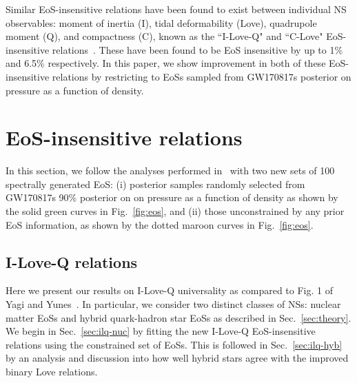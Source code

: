 \documentclass[prd,twocolumn,nofootinbib,superscriptaddress,amsmath,amssymb]{revtex4-1}
\begin{document}
Similar EoS-insensitive relations have been found to exist between individual NS observables: moment of inertia (I), tidal deformability (Love), quadrupole moment (Q), and compactness (C), known as the ``I-Love-Q" and ``C-Love" EoS-insensitive relations~\cite{Yagi:ILQ, Yagi:binLove}.
These have been found to be EoS insensitive by up to 1\% and 6.5\% respectively.
In this paper, we show improvement in both of these EoS-insensitive relations by restricting to EoSs sampled from GW170817s posterior on pressure as a function of density.
\section{EoS-insensitive relations}\label{sec:universal}
In this section, we follow the analyses performed in~\cite{Yagi:binLove,Yagi:ILQ} with two new sets of 100 spectrally generated EoS: (i) posterior samples randomly selected from GW170817s 90\% posterior on on pressure as a function of density as shown by the solid green curves in Fig.~\ref{fig:eos}, and (ii) those unconstrained by any prior EoS information, as shown by the dotted maroon curves in Fig.~\ref{fig:eos}.

\subsection{I-Love-Q relations}\label{sec:ilq}
Here we present our results on I-Love-Q universality as compared to Fig. 1 of Yagi and Yunes~\cite{Yagi:ILQ}.
In particular, we consider two distinct classes of NSs: nuclear matter EoSs and hybrid quark-hadron star EoSs as described in Sec.~\ref{sec:theory}.
We begin in Sec.~\ref{sec:ilq-nuc} by fitting the new I-Love-Q EoS-insensitive relations using the constrained set of EoSs.
This is followed in Sec.~\ref{sec:ilq-hyb} by an analysis and discussion into how well hybrid stars agree with the improved binary Love relations. 
\end{document}
